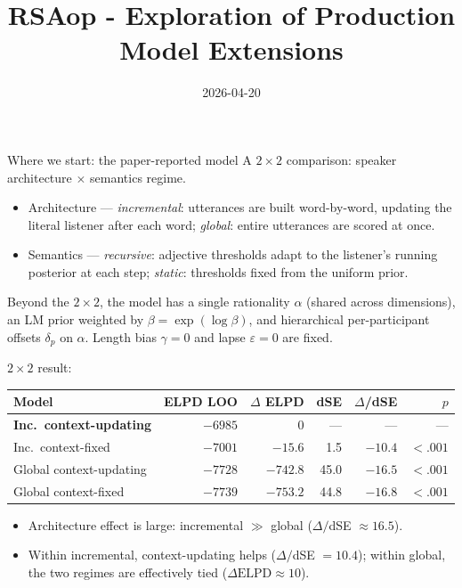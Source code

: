 \documentclass[10pt,aspectratio=169]{beamer}
\title{RSAop - Exploration of Production Model Extensions}
\date{2026-04-20}
\newcommand{\main}[1]{\textcolor{CSP-main-dark}{\textbf{#1}}}
\begin{document}
\begin{frame}
\titlepage
\end{frame}

\begin{frame}{Where we start: the paper-reported model}
\small
A $2\!\times\!2$ comparison: speaker architecture $\times$ semantics regime.

\vspace{0.3em}
\begin{itemize}\itemsep0.15em
  \item Architecture --- \emph{incremental}: utterances are built word-by-word, updating the literal listener after each word; \emph{global}: entire utterances are scored at once.
  \item Semantics --- \emph{recursive}: adjective thresholds adapt to the listener's running posterior at each step; \emph{static}: thresholds fixed from the uniform prior.
\end{itemize}

\vspace{0.3em}
Beyond the $2\!\times\!2$, the model has a single rationality $\alpha$ (shared across dimensions), an LM prior weighted by $\beta = \exp(\log\beta)$, and hierarchical per-participant offsets $\delta_p$ on $\alpha$.
Length bias $\gamma = 0$ and lapse $\varepsilon = 0$ are fixed.

\vspace{0.3em}
$2\!\times\!2$ result:
\begin{center}\footnotesize
\begin{tabular}{lrrrrr}
\toprule
Model & ELPD LOO & $\Delta$ ELPD & dSE & $\Delta$/dSE & $p$\\
\midrule
\main{Inc.\ context-updating} & \main{$-6985$} & $0$ & --- & --- & ---\\
Inc.\ context-fixed           & $-7001$ & $-15.6$  & 1.5  & $-10.4$ & $<.001$\\
Global context-updating       & $-7728$ & $-742.8$ & 45.0 & $-16.5$ & $<.001$\\
Global context-fixed          & $-7739$ & $-753.2$ & 44.8 & $-16.8$ & $<.001$\\
\bottomrule
\end{tabular}
\end{center}

\vspace{0.2em}
\begin{itemize}\itemsep0.15em
  \item Architecture effect is large: incremental $\gg$ global ($\Delta/$dSE $\approx 16.5$).
  \item Within incremental, context-updating helps ($\Delta/$dSE $= 10.4$); within global, the two regimes are effectively tied ($\Delta\text{ELPD} \approx 10$).
\end{itemize}
\end{frame}
\end{document}
